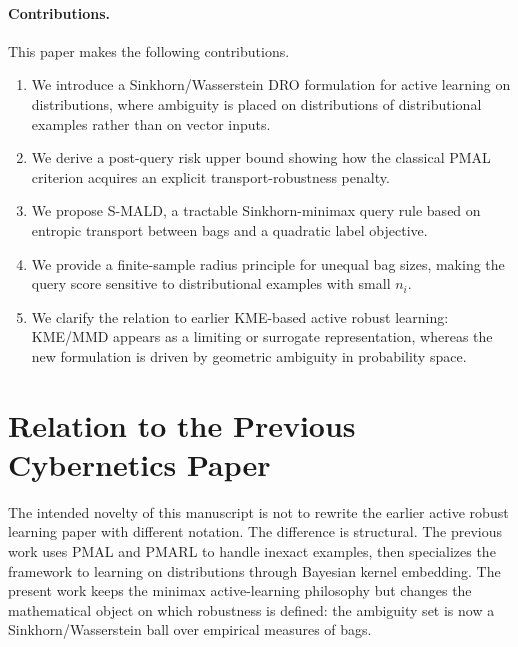 \documentclass[11pt,a4paper]{article}
\begin{document}
\paragraph{Contributions.}
This paper makes the following contributions.
\begin{enumerate}[leftmargin=1.4em]
    \item We introduce a Sinkhorn/Wasserstein DRO formulation for active learning on distributions, where ambiguity is placed on distributions of distributional examples rather than on vector inputs.
    \item We derive a post-query risk upper bound showing how the classical PMAL criterion acquires an explicit transport-robustness penalty.
    \item We propose S-MALD, a tractable Sinkhorn-minimax query rule based on entropic transport between bags and a quadratic label objective.
    \item We provide a finite-sample radius principle for unequal bag sizes, making the query score sensitive to distributional examples with small $n_i$.
    \item We clarify the relation to earlier KME-based active robust learning: KME/MMD appears as a limiting or surrogate representation, whereas the new formulation is driven by geometric ambiguity in probability space.
\end{enumerate}

\section{Relation to the Previous Cybernetics Paper}

The intended novelty of this manuscript is not to rewrite the earlier active robust learning paper with different notation. The difference is structural. The previous work uses PMAL and PMARL to handle inexact examples, then specializes the framework to learning on distributions through Bayesian kernel embedding. The present work keeps the minimax active-learning philosophy but changes the mathematical object on which robustness is defined: the ambiguity set is now a Sinkhorn/Wasserstein ball over empirical measures of bags.
\end{document}
